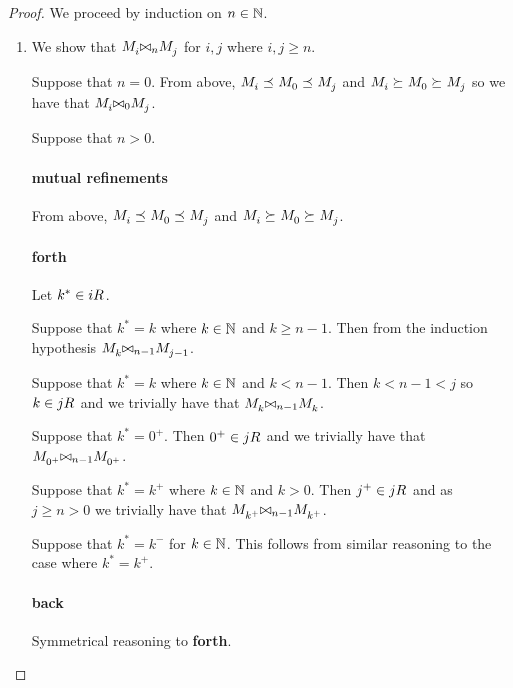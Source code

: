\begin{proof}
We proceed by induction on $n \in \mathbb{N}$.

\begin{enumerate}
    \item We show that $\kPModel{i} \bisimref[n] \kPModel{j}$ for $i, j$ where $i, j \geq n$.

    Suppose that $n = 0$. 
    From above, $\kPModel{i} \refines \kPModel{0} \refines \kPModel{j}$ and $\kPModel{i} \simulates \kPModel{0} \simulates \kPModel{j}$ so we have that $\kPModel{i} \bisimref[0] \kPModel{j}$.

    Suppose that $n > 0$.

    \paragraph{mutual refinements}

    From above, $\kPModel{i} \refines \kPModel{0} \refines \kPModel{j}$
    and $\kPModel{i} \simulates \kPModel{0} \simulates \kPModel{j}$.

    \paragraph{forth}

    Let $k^* \in \kSuccessors{}{i}$.

    Suppose that $k^* = k$ where $k \in \mathbb{N}$ and $k \geq n - 1$.
    Then from the induction hypothesis $\kPModel{k} \bisimref[n-1] \kPModel{j - 1}$.

    Suppose that $k^* = k$ where $k \in \mathbb{N}$ and $k < n - 1$.
    Then $k < n - 1 < j$ so $k \in \kSuccessors{}{j}$ and we trivially have that $\kPModel{k} \bisimref[n - 1] \kPModel{k}$.

    Suppose that $k^* = 0^+$.
    Then $0^+ \in \kSuccessors{}{j}$ and we trivially have that $\kPModel{0^+} \bisimref[n - 1] \kPModel{0^+}$.

    Suppose that $k^* = k^+$ where $k \in \mathbb{N}$ and $k > 0$.
    Then $j^+ \in \kSuccessors{}{j}$ and as $j \geq n > 0$ we trivially have that $\kPModel{k^+} \bisimref[n - 1] \kPModel{k^+}$.

    Suppose that $k^* = k^-$ for $k \in \mathbb{N}$. This follows from similar reasoning to the case where $k^* = k^+$.

    \paragraph{back}

    Symmetrical reasoning to {\bf forth}.


\end{enumerate}
\end{proof}
